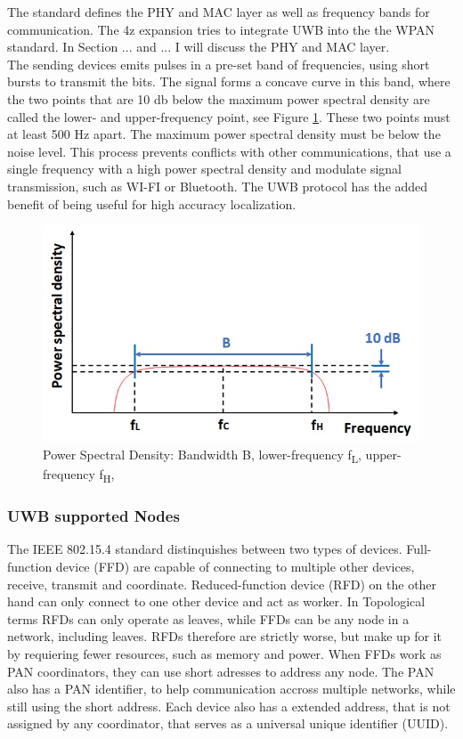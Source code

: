The standard defines the PHY and MAC layer as well as frequency bands for communication.
The 4z expansion tries to integrate UWB into the the WPAN standard. In Section ... and ... I will discuss the PHY and MAC layer.\\

The sending devices emits pulses in a pre-set band of frequencies, using short bursts to transmit the bits.
The signal forms a concave curve in this band, where the two points that are 10 db below the maximum power spectral density are called the lower- and upper-frequency point, see Figure \ref{f:UWB_spectrum}.
These two points must at least 500 Hz apart.
The maximum power spectral density must be below the noise level.
This process prevents conflicts with other communications, that use a single frequency with a high power spectral density and modulate signal transmission, such as WI-FI or Bluetooth.
The UWB protocol has the added benefit of being useful for high accuracy localization.


\begin{figure}[ht!]
\centering
\includegraphics[width=\linewidth]{graphics/UWB_spectrum.jpg}
\caption{Power Spectral Density: Bandwidth B, lower-frequency f\textsubscript{L}, upper-frequency f\textsubscript{H}, \cite{hsu_2021}}
\label{f:UWB_spectrum}
\end{figure}


\subsubsection{UWB supported Nodes}

The IEEE 802.15.4 standard distinquishes between two types of devices.
Full-function device (FFD) are capable of connecting to multiple other devices, receive, transmit and coordinate. Reduced-function device (RFD) on the other hand can only connect to one other device and act as worker. 
In Topological terms RFDs can only operate as leaves, while FFDs can be any node in a network, including leaves.
RFDs therefore are strictly worse, but make up for it by requiering fewer resources, such as memory and power.
When FFDs work as PAN coordinators, they can use short adresses to address any node.
The PAN also has a PAN identifier, to help communication accross multiple networks, while still using the short address.
Each device also has a extended address, that is not assigned by any coordinator, that serves as a universal unique identifier (UUID).


